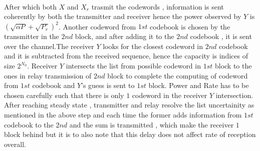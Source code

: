 \\After which both \( X \) and \( X_r \) trasmit the codewords , information is sent coherently by both the transmitter and receiver hence the power observed by \( Y \) is \( (\sqrt{\alpha P} + \sqrt{P_r})^2 \).
\newpage
Another codeword from $1st$ codebook is chosen by the transmitter in the $2nd $ block, and after adding it to the $2nd $ codebook , it is sent over the channel.The receiver \( Y \) looks for the closest codeword in $2nd$ codebook and it is subtracted from the received sequence, hence the  capacity is indices of size \(2^{N_0}\).
Receiver \( Y \) intersects the list from possible codeword in $1st$ block to the ones in relay transmission of $2nd$ block to complete the computing of codeword from $1st$ codebook and \(Y\)'s guess is sent to $1st$ block. Power and Rate has to be chosen carefully such that there is only $1$ codeword in the receiver \( Y \) intersection.
\\
After reaching steady state , transmitter and relay resolve the list uncertainity as mentioned in the above step and each time the former adds information from $1st$ codebook to the $2nd$ and the sum is transmitted , which make the receiver $1$ block behind but it is to also note that this delay does not affect rate of reception overall.

